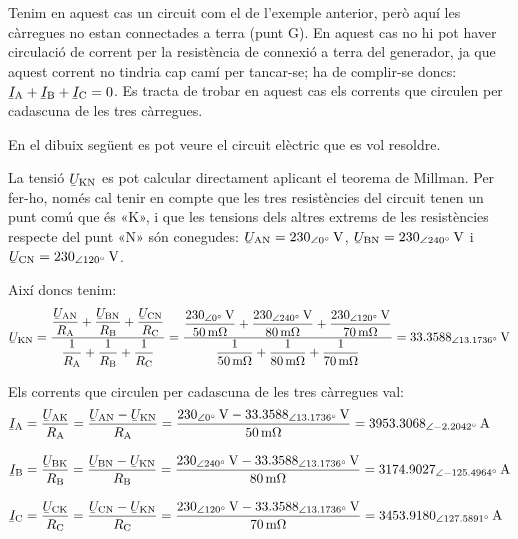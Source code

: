 \begin{exemple}
    Tenim en aquest cas un circuit com el de l'exemple anterior, però aquí les càrregues no estan connectades a terra (punt G). En aquest cas no hi pot haver circulació de corrent per la resistència de connexió a terra del generador, ja que aquest corrent no tindria cap camí per tancar-se; ha de complir-se doncs: $\cmplx{I}\ped{A} + \cmplx{I}\ped{B} + \cmplx{I}\ped{C} = 0$. Es tracta de trobar en aquest cas els corrents que circulen per cadascuna de les tres càrregues.

    En el dibuix següent es pot veure el circuit elèctric que es vol resoldre.

    \begin{center}
        
    \end{center}

    La tensió $\cmplx{U}\ped{KN}$ es pot calcular directament aplicant el teorema de Millman. Per fer-ho, només cal tenir en compte que les tres resistències del circuit tenen un punt comú que és «K», i que les tensions dels altres extrems de les resistències respecte del punt «N» són conegudes: $\cmplx{U}\ped{AN}=\SIpd{230}{0}{V}$, $\cmplx{U}\ped{BN}=\SIpd{230}{240}{V}$ i $\cmplx{U}\ped{CN}=\SIpd{230}{120}{V}$.

    Així doncs tenim:
    \[
    \cmplx{U}\ped{KN} = \frac{ \dfrac{\cmplx{U}\ped{AN}}{R\ped{A}} + \dfrac{\cmplx{U}\ped{BN}}{R\ped{B}} + \dfrac{\cmplx{U}\ped{CN}}{R\ped{C}}} { \dfrac{1}{R\ped{A}} + \dfrac{1}{R\ped{B}} + \dfrac{1}{R\ped{C}}} =
    \frac{\dfrac{\SIpd{230}{0}{V}}{\SI{50}{m\ohm}}+\dfrac{\SIpd{230}{240}{V}}{\SI{80}{m\ohm}}+
    \dfrac{\SIpd{230}{120}{V}}{\SI{70}{m\ohm}}}{\dfrac{1}{\SI{50}{m\ohm}}+\dfrac{1}{\SI{80}{m\ohm}}+
    \dfrac{1}{\SI{70}{m\ohm}}} =
    \SIpd{33,3588}{13,1736}{V}
    \]


    Els corrents que circulen per cadascuna de les tres càrregues val:
    \begin{align*}
    \cmplx{I}\ped{A} &= \frac{\cmplx{U}\ped{AK}}{R\ped{A}} = \frac{\cmplx{U}\ped{AN} - \cmplx{U}\ped{KN}}{R\ped{A}} = \frac{\SIpd{230}{0}{V}-\SIpd{33,3588}{13,1736}{V}}{\SI{50}{m\ohm}}
    = \SIpd{3953,3068}{-2,2042}{A}\\[2ex]
    \cmplx{I}\ped{B} &= \frac{\cmplx{U}\ped{BK}}{R\ped{B}} = \frac{\cmplx{U}\ped{BN} - \cmplx{U}\ped{KN}}{R\ped{B}} = \frac{\SIpd{230}{240}{V}-\SIpd{33,3588}{13,1736}{V}}{\SI{80}{m\ohm}}
    = \SIpd{3174,9027}{-125,4964}{A}\\[2ex]
    \cmplx{I}\ped{C} &= \frac{\cmplx{U}\ped{CK}}{R\ped{C}} = \frac{\cmplx{U}\ped{CN} - \cmplx{U}\ped{KN}}{R\ped{C}} = \frac{\SIpd{230}{120}{V}-\SIpd{33,3588}{13,1736}{V}}{\SI{70}{m\ohm}}
    = \SIpd{3453,9180}{127,5891}{A}
    \end{align*}
\end{exemple}


